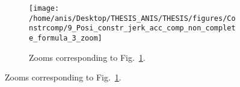 \begin{figure}[!htbp]
\begin{figure}[!htbp]
\label{fig:9_Posi_constr_jerk_acc_comp_non_complete_formula_3}
\end{figure}
\begin{figure}[!htbp]
\centering
\texttt{[image: /home/anis/Desktop/THESIS\_ANIS/THESIS/figures/Constrcomp/9\_Posi\_constr\_jerk\_acc\_comp\_non\_complete\_formula\_3\_zoom]}
\caption{Zooms corresponding to Fig.~\ref{fig:9_Posi_constr_jerk_acc_comp_non_complete_formula_3}.} 
\label{fig:9_Posi_constr_jerk_acc_comp_non_complete_formula_3_zoom}
\end{figure}
%

\end{figure}
